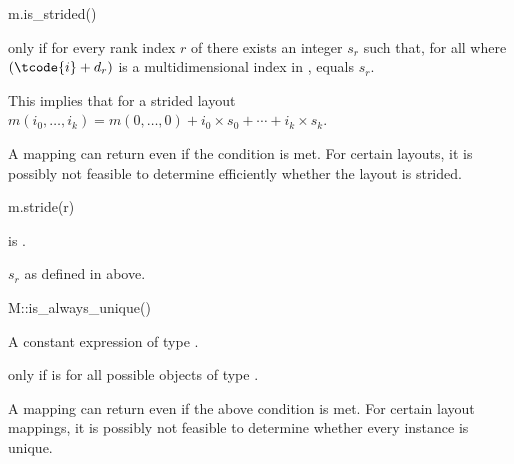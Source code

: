 \begin{itemdecl}
m.is_strided()
\end{itemdecl}

\begin{itemdescr}
\pnum
\result
{}

\pnum
\returns
{} only if
for every rank index $r$ of  there exists an integer $s_r$
such that,
for all  where $(\tcode{i}+d_r)$ is
a multidimensional index in ,
 equals $s_r$.
\begin{note}
This implies that for a strided layout
$m(i_0, \dotsc, i_k) = m(0, \dotsc, 0) + i_0 \times s_0 + \dotsb + i_k \times s_k$.
\end{note}
\begin{note}
A mapping can return  even if the condition is met.
For certain layouts, it is possibly not feasible to determine efficiently
whether the layout is strided.
\end{note}
\end{itemdescr}

\begin{itemdecl}
m.stride(r)
\end{itemdecl}

\begin{itemdescr}
\pnum
\expects
{} is .

\pnum
\result
{}

\pnum
\returns
$s_r$ as defined in  above.
\end{itemdescr}

\begin{itemdecl}
M::is_always_unique()
\end{itemdecl}

\begin{itemdescr}
\pnum
\result
A constant expression of type .

\pnum
\returns
{} only if  is 
for all possible objects  of type .
\begin{note}
A mapping can return  even if the above condition is met.
For certain layout mappings, it is possibly not feasible to determine
whether every instance is unique.
\end{note}
\end{itemdescr}

